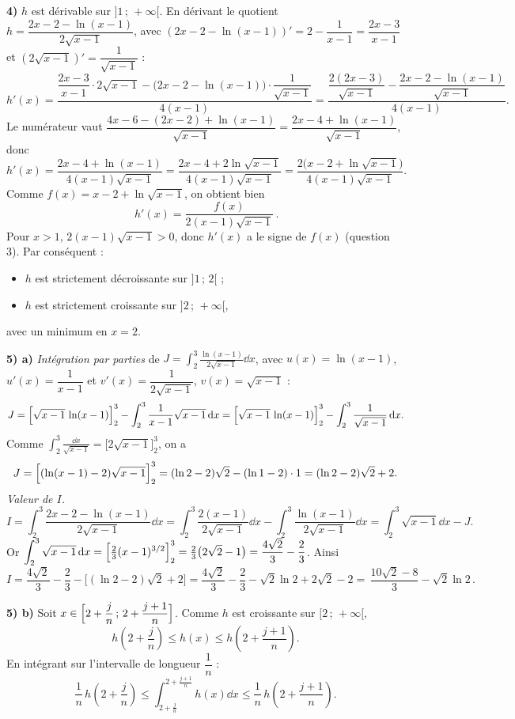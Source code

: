 \noindent\textbf{4)} $h$ est dérivable sur $]1\,;\,+\infty[$. En dérivant le quotient
$h=\dfrac{2x-2-\ln(x-1)}{2\sqrt{x-1}}$, avec
$(2x-2-\ln(x-1))'=2-\dfrac1{x-1}=\dfrac{2x-3}{x-1}$ et $(2\sqrt{x-1})'=\dfrac1{\sqrt{x-1}}$ :
\[
h'(x)=\frac{\dfrac{2x-3}{x-1}\cdot 2\sqrt{x-1}-\bigl(2x-2-\ln(x-1)\bigr)\cdot\dfrac1{\sqrt{x-1}}}{4(x-1)}
=\frac{\dfrac{2(2x-3)}{\sqrt{x-1}}-\dfrac{2x-2-\ln(x-1)}{\sqrt{x-1}}}{4(x-1)}.
\]
Le numérateur vaut $\dfrac{4x-6-(2x-2)+\ln(x-1)}{\sqrt{x-1}}=\dfrac{2x-4+\ln(x-1)}{\sqrt{x-1}}$, donc
\[
h'(x)=\frac{2x-4+\ln(x-1)}{4(x-1)\sqrt{x-1}}
=\frac{2x-4+2\ln\sqrt{x-1}}{4(x-1)\sqrt{x-1}}
=\frac{2\bigl(x-2+\ln\sqrt{x-1}\bigr)}{4(x-1)\sqrt{x-1}}.
\]
Comme $f(x)=x-2+\ln\sqrt{x-1}$, on obtient bien
\[
\boxed{\,h'(x)=\frac{f(x)}{2(x-1)\sqrt{x-1}}\,}.
\]
Pour $x>1$, $2(x-1)\sqrt{x-1}>0$, donc $h'(x)$ a le signe de $f(x)$ (question 3). Par conséquent :
\begin{itemize}
\item $h$ est strictement décroissante sur $]1\,;\,2[$ ;
\item $h$ est strictement croissante sur $]2\,;\,+\infty[$,
\end{itemize}
avec un minimum en $x=2$.

\noindent\textbf{5) a)} \emph{Intégration par parties} de
$\displaystyle J=\int_2^3\frac{\ln(x-1)}{2\sqrt{x-1}}\dd x$, avec
$u(x)=\ln(x-1)$, $u'(x)=\dfrac1{x-1}$ et $v'(x)=\dfrac1{2\sqrt{x-1}}$, $v(x)=\sqrt{x-1}$ :
\[
J=\Bigl[\sqrt{x-1}\,\ln(x-1)\Bigr]_2^3-\int_2^3\frac{1}{x-1}\sqrt{x-1}\,\mathrm{d} x
=\Bigl[\sqrt{x-1}\,\ln(x-1)\Bigr]_2^3-\int_2^3\frac{1}{\sqrt{x-1}}\,\mathrm{d} x.
\]
Comme $\displaystyle\int_2^3\frac{\dd x}{\sqrt{x-1}}=\bigl[2\sqrt{x-1}\bigr]_2^3$, on a
\[
J=\Bigl[(\ln(x-1)-2)\sqrt{x-1}\Bigr]_2^3=(\ln2-2)\sqrt2-(\ln1-2)\cdot1=(\ln2-2)\sqrt2+2.
\]
\emph{Valeur de $I$.}
\[
I=\int_2^3\frac{2x-2-\ln(x-1)}{2\sqrt{x-1}}\dd x
=\int_2^3\frac{2(x-1)}{2\sqrt{x-1}}\dd x-\int_2^3\frac{\ln(x-1)}{2\sqrt{x-1}}\dd x
=\int_2^3\sqrt{x-1}\dd x-J.
\]
Or $\displaystyle\int_2^3\sqrt{x-1}\,\mathrm{d} x=\Bigl[\tfrac23(x-1)^{3/2}\Bigr]_2^3=\tfrac23\bigl(2\sqrt2-1\bigr)=\frac{4\sqrt2}{3}-\frac23$. Ainsi
\[
I=\frac{4\sqrt2}{3}-\frac23-\bigl[(\ln2-2)\sqrt2+2\bigr]
=\frac{4\sqrt2}{3}-\frac23-\sqrt2\ln2+2\sqrt2-2
=\boxed{\,\frac{10\sqrt2-8}{3}-\sqrt2\ln2\,}.
\]

\noindent\textbf{5) b)} Soit $x\in\Bigl[2+\dfrac jn\,;\,2+\dfrac{j+1}{n}\Bigr]$. Comme $h$ est
croissante sur $[2\,;\,+\infty[$,
\[
h\!\left(2+\frac jn\right)\le h(x)\le h\!\left(2+\frac{j+1}{n}\right).
\]
En intégrant sur l'intervalle de longueur $\dfrac1n$ :
\[
\frac1n\,h\!\left(2+\frac jn\right)\le\int_{2+\frac jn}^{2+\frac{j+1}{n}}h(x)\dd x\le\frac1n\,h\!\left(2+\frac{j+1}{n}\right).
\]

